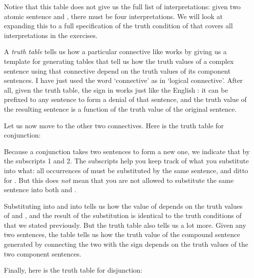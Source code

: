 \begin{center}
\end{center}
 
Notice that this table does not give us the full list of interpretations: given two 
atomic sentence  and , there must be four interpretations. We will look at 
expanding this to a full specification of the truth condition of  that covers all interpretations in the exercises.

A \emph{truth table} tells us how a particular connective like \p{\lnot} works 
by giving us a template for generating tables that tell us how the truth values 
of a complex sentence using that connective depend on the truth values of its 
component sentences.
I have just used the word  `connective' as in `logical connective'.  After all, 
given the truth table, the \p{\lnot} sign in \lL[S]{} works just like the 
English : it can be prefixed to any sentence to form 
a denial of that sentence, and the truth value of the resulting sentence is a 
function of the truth value of the original sentence.

Let us now move to the other two connectives. Here is the truth table for 
conjunction:

\begin{center}
\end{center}

Because a conjunction takes two sentences to form a new one, we indicate that by 
the subscripts 1 and 2.   The subscripts help you keep track of what you 
substitute into what: all occurrences of  must be substituted by the same 
sentence, and ditto for . But this does \emph{not} mean that you are not 
allowed to substitute the same sentence into both  and .  

Substituting  into  and  into  tells us how the value of 
 depends on the truth values of  and , and the result of 
the substitution is identical to the truth conditions of   that we 
stated previously.  But the truth table also tells us a lot more.  Given any two 
sentences, the table tells us how the truth value of the compound sentence 
generated by connecting the two with the \p{\land} sign depends on the truth 
values of the two component sentences.  

Finally, here is the truth table for disjunction:

\begin{center}
\end{center}

